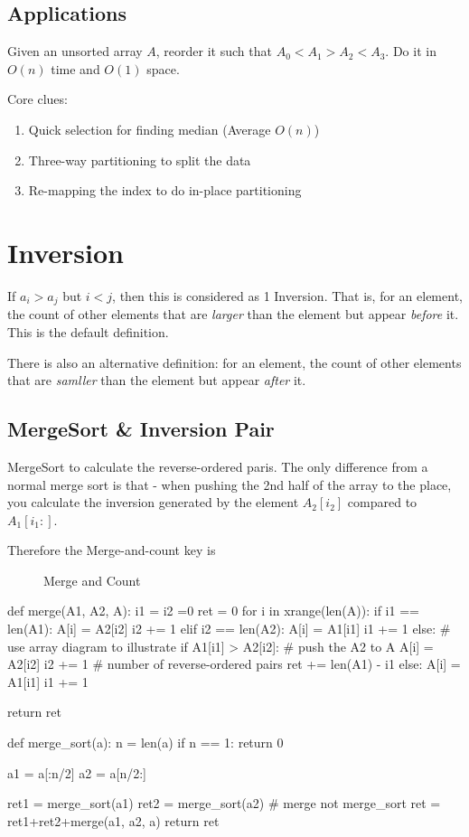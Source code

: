 \subsection{Applications}
 Given an unsorted array $A$, reorder it such that $A_0 < A_1 > A_2 < A_3$. Do it in $O(n)$ time and $O(1)$ space. 

Core clues:
\begin{enumerate}
\item Quick selection for finding median (Average $O(n)$)
\item Three-way partitioning to split the data
\item Re-mapping the index to do in-place partitioning
\end{enumerate}
\section{Inversion}
If $a_i > a_j$ but $i<j$, then this is considered as 1 Inversion. That is, for an element, the count of other elements that are \textit{larger} than the element but appear \textit{before} it. This is the default definition. 

There is also an alternative definition: for an element, the count of other elements that are \textit{samller} than the element but appear \textit{after} it. 

\subsection{MergeSort \& Inversion Pair}
MergeSort to calculate the reverse-ordered paris. The only difference from a normal
merge sort is that - when pushing the 2nd half of the array to the place, you calculate
the inversion generated by the element $A_2[i_2]$ compared to $A_1[i_1:]$.

Therefore the Merge-and-count key is 

\begin{figure}[hbtp]
\centering
{}
\caption{Merge and Count}
\label{fig:mergeAndSort}
\end{figure}

\begin{python}
def merge(A1, A2, A):
  i1 = i2 =0
  ret = 0
  for i in xrange(len(A)):
    if i1 == len(A1):
      A[i] = A2[i2]
      i2 += 1
    elif i2 == len(A2):
      A[i] = A1[i1]
      i1 += 1
    else:
      # use array diagram to illustrate
      if A1[i1] > A2[i2]:  # push the A2 to A
        A[i] = A2[i2]
        i2 += 1
        # number of reverse-ordered pairs
        ret += len(A1) - i1
      else:
        A[i] = A1[i1]
        i1 += 1

  return ret

def merge_sort(a):
  n = len(a)
  if n == 1:
    return 0

  a1 = a[:n/2]
  a2 = a[n/2:]

  ret1 = merge_sort(a1)
  ret2 = merge_sort(a2)
  # merge not merge_sort
  ret = ret1+ret2+merge(a1, a2, a)  
  return ret
\end{python}

